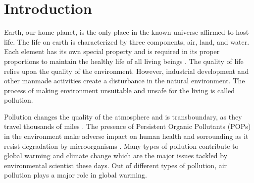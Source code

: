 \chapter{Introduction}
\setcounter{page}{1}




Earth, our home planet, is the only place in the known universe affirmed to host life. The life on earth is characterized by three components, air, land, and water. Each element has its own special property and is required in its proper proportions to maintain the healthy life of all living beings \cite{environment}. The quality of life relies upon the quality of the environment. However, industrial development and  other manmade activities create a disturbance in the natural environment. The process of making environment unsuitable and unsafe for the living is called pollution. 
\par
 Pollution changes the quality of the atmosphere and is transboundary, as they travel thousands of miles \cite{environment}. The presence of Persistent Organic Pollutants (POPs) \cite{RitterL.SolomonK.R.&Forget2005} in the environment make adverse impact on human health and sorrounding as it resist degradation by microorganisms \cite{pops}. Many types of pollution contribute to global warming and climate change which are the major issues tackled by environmental scientist these days. Out of different types of pollution, air pollution plays a major role in global warming.
 
  
